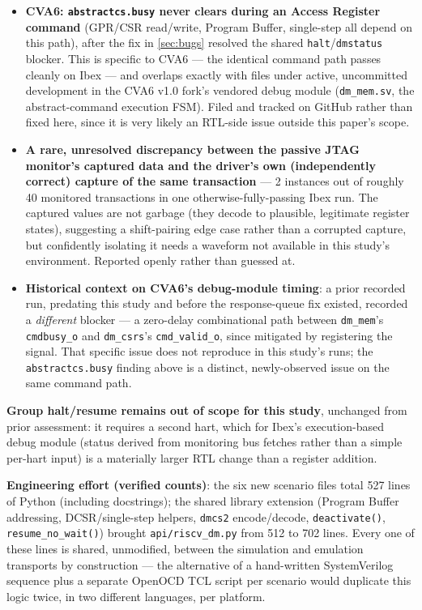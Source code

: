 \documentclass[conference]{IEEEtran}
\begin{document}
\begin{itemize}
\item \textbf{CVA6: \texttt{abstractcs.busy} never clears during an Access Register command} (GPR/CSR read/write, Program Buffer, single-step all depend on this path), after the fix in \ref{sec:bugs} resolved the shared \texttt{halt}/\texttt{dmstatus} blocker. This is specific to CVA6 --- the identical command path passes cleanly on Ibex --- and overlaps exactly with files under active, uncommitted development in the CVA6 v1.0 fork's vendored debug module (\texttt{dm\_mem.sv}, the abstract-command execution FSM). Filed and tracked on GitHub rather than fixed here, since it is very likely an RTL-side issue outside this paper's scope.
\item \textbf{A rare, unresolved discrepancy between the passive JTAG monitor's captured data and the driver's own (independently correct) capture of the same transaction} --- 2 instances out of roughly 40 monitored transactions in one otherwise-fully-passing Ibex run. The captured values are not garbage (they decode to plausible, legitimate register states), suggesting a shift-pairing edge case rather than a corrupted capture, but confidently isolating it needs a waveform not available in this study's environment. Reported openly rather than guessed at.
\item \textbf{Historical context on CVA6's debug-module timing}: a prior recorded run, predating this study and before the response-queue fix existed, recorded a \textit{different} blocker --- a zero-delay combinational path between \texttt{dm\_mem}'s \texttt{cmdbusy\_o} and \texttt{dm\_csrs}'s \texttt{cmd\_valid\_o}, since mitigated by registering the signal. That specific issue does not reproduce in this study's runs; the \texttt{abstractcs.busy} finding above is a distinct, newly-observed issue on the same command path.
\end{itemize}

\textbf{Group halt/resume remains out of scope for this study}, unchanged from prior assessment: it requires a second hart, which for Ibex's execution-based debug module (status derived from monitoring bus fetches rather than a simple per-hart input) is a materially larger RTL change than a register addition.

\textbf{Engineering effort (verified counts)}: the six new scenario files total 527 lines of Python (including docstrings); the shared library extension (Program Buffer addressing, DCSR/single-step helpers, \texttt{dmcs2} encode/decode, \texttt{deactivate()}, \texttt{resume\_no\_wait()}) brought \texttt{api/riscv\_dm.py} from 512 to 702 lines. Every one of these lines is shared, unmodified, between the simulation and emulation transports by construction --- the alternative of a hand-written SystemVerilog sequence plus a separate OpenOCD TCL script per scenario would duplicate this logic twice, in two different languages, per platform.
\end{document}
